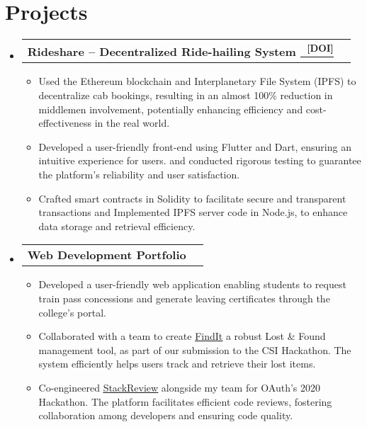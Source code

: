 \documentclass[letterpaper,11pt]{article}
\makeatletter
\newcommand{\resumeItem}[1]{
  \item\small{
    {#1 \vspace{-2pt}}
  }
}
\newcommand{\resumeProjectHeading}[2]{
    \item
    \begin{tabular*}{1.001\textwidth}{l@{\extracolsep{\fill}}r}
      \small#1 & \textbf{\small #2}\\
    \end{tabular*}\vspace{-7pt}
}
\newcommand{\resumeSubHeadingListStart}{\begin{itemize}[leftmargin=0.0in, label={}]}
\newcommand{\resumeSubHeadingListEnd}{\end{itemize}}
\newcommand{\resumeItemListStart}{\begin{itemize}}
\newcommand{\resumeItemListEnd}{\end{itemize}\vspace{-5pt}}
\makeatother
\begin{document}
\section{Projects}
\vspace{-5pt}
\resumeSubHeadingListStart
\resumeProjectHeading
{\textbf{Rideshare -- Decentralized Ride-hailing System
      {\href{https://ieeexplore.ieee.org/document/10037296}{\
          \underline{\textsuperscript{[DOI]}}}}}}{}
\resumeItemListStart
\resumeItem{Used the Ethereum blockchain and Interplanetary File
  System (IPFS) to decentralize cab bookings, resulting in an almost
  100\% reduction in middlemen involvement, potentially enhancing
  efficiency and cost-effectiveness in the real world.}
\resumeItem{Developed a user-friendly front-end using Flutter and
  Dart, ensuring an intuitive experience for users. and conducted
  rigorous testing to guarantee the platform's reliability and user
  satisfaction.}
\resumeItem{Crafted smart contracts in Solidity to facilitate
  secure and transparent transactions and Implemented IPFS server
  code in Node.js, to enhance data storage and retrieval efficiency.}
\resumeItemListEnd
\vspace{-13pt}
\resumeProjectHeading
{\textbf{Web Development Portfolio}}{}
\resumeItemListStart
\resumeItem{Developed a user-friendly web application enabling students to request train pass concessions and generate leaving certificates through the college's portal.}
\resumeItem{Collaborated with a team to create \underline{\href{https://www.github.com/nimaipatel/findit}{FindIt}} a robust Lost \& Found management tool, as part of our submission to the CSI Hackathon. The system efficiently helps users track and retrieve their lost items.}
\resumeItem{Co-engineered \underline{\href{https://www.github.com/stack-review}{StackReview}} alongside my team for OAuth's 2020 Hackathon. The platform facilitates efficient code reviews, fostering collaboration among developers and ensuring code quality.}
\resumeItemListEnd
\vspace{-13pt}
\resumeSubHeadingListEnd
\vspace{-2pt}

%
\end{document}
